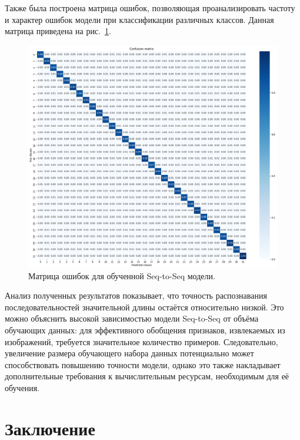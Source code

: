 \documentclass{altsu-report}
\begin{document}
\vspace{-0.7cm}

Также была построена матрица ошибок, позволяющая проанализировать частоту и характер ошибок модели при классификации различных классов. Данная матрица приведена на рис.~\ref{fig:cm}.

\begin{figure}[H]
    \centering
    \includegraphics[width=1\linewidth]{imgs/Confusion_matrix.png}
    \caption{Матрица ошибок для обученной Seq-to-Seq модели.}
    \label{fig:cm}
\end{figure}

\vspace{-0.7cm}

Анализ полученных результатов показывает, что точность распознавания последовательностей значительной длины остаётся относительно низкой. Это можно объяснить высокой зависимостью модели Seq-to-Seq от объёма обучающих данных: для эффективного обобщения признаков, извлекаемых из изображений, требуется значительное количество примеров. Следовательно, увеличение размера обучающего набора данных потенциально может способствовать повышению точности модели, однако это также накладывает дополнительные требования к вычислительным ресурсам, необходимым для её обучения.

\chapter*{Заключение}
\end{document}
